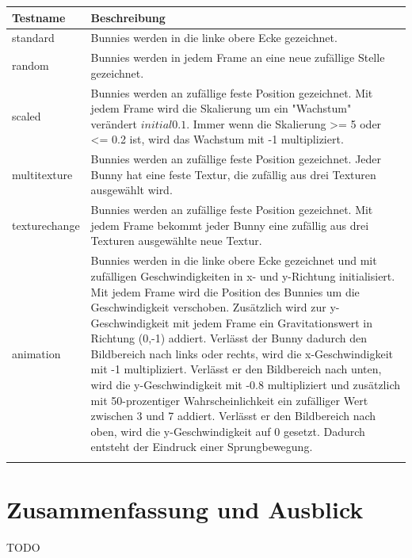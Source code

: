 \begin{center}
    \begin{tabular}{ | l | p{12cm} |}
    \hline
    Testname & Beschreibung \\ \hline
    standard & Bunnies werden in die linke obere Ecke gezeichnet.\\ \hline
    random & Bunnies werden in jedem Frame an eine neue zufällige Stelle gezeichnet.\\ \hline
    scaled & Bunnies werden an zufällige feste Position gezeichnet. Mit jedem Frame wird die Skalierung um ein "Wachstum" verändert \(initial 0.1\). Immer wenn die Skalierung >= 5 oder <= 0.2 ist, wird das Wachstum mit -1 multipliziert. \\ \hline
    multitexture & Bunnies werden an zufällige feste Position gezeichnet. Jeder Bunny hat eine feste Textur, die zufällig aus drei Texturen ausgewählt wird.\\ \hline
    texturechange & Bunnies werden an zufällige feste Position gezeichnet. Mit jedem Frame bekommt jeder Bunny eine zufällig aus drei Texturen ausgewählte neue Textur. \\ \hline
    animation & Bunnies werden in die linke obere Ecke gezeichnet und mit zufälligen Geschwindigkeiten in x- und y-Richtung initialisiert. Mit jedem Frame wird die Position des Bunnies um die Geschwindigkeit verschoben. Zusätzlich wird zur y-Geschwindigkeit mit jedem Frame ein Gravitationswert in Richtung (0,-1) addiert. Verlässt der Bunny dadurch den Bildbereich nach links oder rechts, wird die x-Geschwindigkeit mit -1 multipliziert. Verlässt er den Bildbereich nach unten, wird die y-Geschwindigkeit mit -0.8 multipliziert und zusätzlich mit 50-prozentiger Wahrscheinlichkeit ein zufälliger Wert zwischen 3 und 7 addiert. Verlässt er den Bildbereich nach oben, wird die y-Geschwindigkeit auf 0 gesetzt. Dadurch entsteht der Eindruck einer Sprungbewegung.\\ \hline
    \\ \hline
    \end{tabular}
\end{center}

\chapter{Zusammenfassung und Ausblick}
TODO

